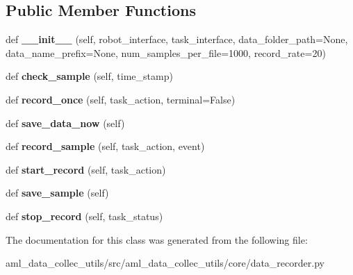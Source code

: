 \subsection*{Public Member Functions}
\begin{DoxyCompactItemize}
\item 
\hypertarget{classaml__data__collec__utils_1_1core_1_1data__recorder_1_1_data_recorder_a006d1834615a84bc3c414d6d0ad78fdf}{}\label{classaml__data__collec__utils_1_1core_1_1data__recorder_1_1_data_recorder_a006d1834615a84bc3c414d6d0ad78fdf} 
def {\bfseries \+\_\+\+\_\+init\+\_\+\+\_\+} (self, robot\+\_\+interface, task\+\_\+interface, data\+\_\+folder\+\_\+path=None, data\+\_\+name\+\_\+prefix=None, num\+\_\+samples\+\_\+per\+\_\+file=1000, record\+\_\+rate=20)
\item 
\hypertarget{classaml__data__collec__utils_1_1core_1_1data__recorder_1_1_data_recorder_a32f1071d9569f6ad9716411b3358d901}{}\label{classaml__data__collec__utils_1_1core_1_1data__recorder_1_1_data_recorder_a32f1071d9569f6ad9716411b3358d901} 
def {\bfseries check\+\_\+sample} (self, time\+\_\+stamp)
\item 
\hypertarget{classaml__data__collec__utils_1_1core_1_1data__recorder_1_1_data_recorder_acbbaf489c4490387dbf0ea433e02f733}{}\label{classaml__data__collec__utils_1_1core_1_1data__recorder_1_1_data_recorder_acbbaf489c4490387dbf0ea433e02f733} 
def {\bfseries record\+\_\+once} (self, task\+\_\+action, terminal=False)
\item 
\hypertarget{classaml__data__collec__utils_1_1core_1_1data__recorder_1_1_data_recorder_a97646346356e504cddc8b65fb4f37c99}{}\label{classaml__data__collec__utils_1_1core_1_1data__recorder_1_1_data_recorder_a97646346356e504cddc8b65fb4f37c99} 
def {\bfseries save\+\_\+data\+\_\+now} (self)
\item 
\hypertarget{classaml__data__collec__utils_1_1core_1_1data__recorder_1_1_data_recorder_a64404ce49930f2ad583bbed996f94a9e}{}\label{classaml__data__collec__utils_1_1core_1_1data__recorder_1_1_data_recorder_a64404ce49930f2ad583bbed996f94a9e} 
def {\bfseries record\+\_\+sample} (self, task\+\_\+action, event)
\item 
\hypertarget{classaml__data__collec__utils_1_1core_1_1data__recorder_1_1_data_recorder_a3434be0394992650da91be0536e4c68b}{}\label{classaml__data__collec__utils_1_1core_1_1data__recorder_1_1_data_recorder_a3434be0394992650da91be0536e4c68b} 
def {\bfseries start\+\_\+record} (self, task\+\_\+action)
\item 
\hypertarget{classaml__data__collec__utils_1_1core_1_1data__recorder_1_1_data_recorder_ad53df0f0bcb316db1e23b85f0fd3bdb7}{}\label{classaml__data__collec__utils_1_1core_1_1data__recorder_1_1_data_recorder_ad53df0f0bcb316db1e23b85f0fd3bdb7} 
def {\bfseries save\+\_\+sample} (self)
\item 
\hypertarget{classaml__data__collec__utils_1_1core_1_1data__recorder_1_1_data_recorder_a3e3b810cd33f176a82f31ccc63771436}{}\label{classaml__data__collec__utils_1_1core_1_1data__recorder_1_1_data_recorder_a3e3b810cd33f176a82f31ccc63771436} 
def {\bfseries stop\+\_\+record} (self, task\+\_\+status)
\end{DoxyCompactItemize}


The documentation for this class was generated from the following file\+:\begin{DoxyCompactItemize}
\item 
aml\+\_\+data\+\_\+collec\+\_\+utils/src/aml\+\_\+data\+\_\+collec\+\_\+utils/core/data\+\_\+recorder.\+py\end{DoxyCompactItemize}
